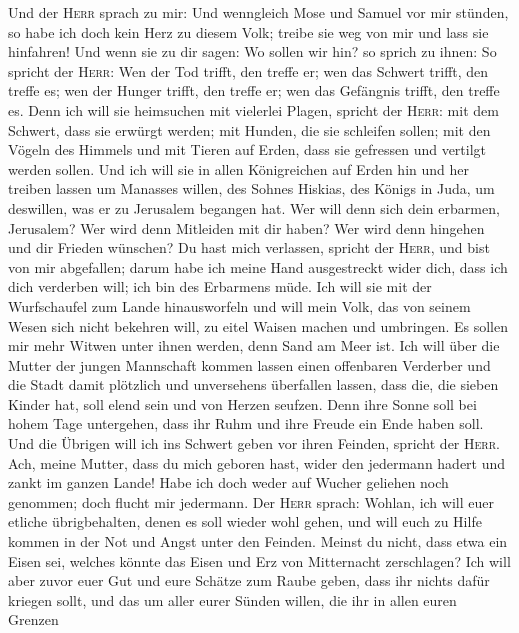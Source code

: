  Und der \textsc{Herr} sprach zu mir: Und wenngleich Mose
und Samuel vor mir stünden, so habe ich doch kein Herz zu diesem Volk;
treibe sie weg von mir und lass sie hinfahren!  Und wenn
sie zu dir sagen: Wo sollen wir hin? so sprich zu ihnen: So spricht der
\textsc{Herr}: Wen der Tod trifft, den treffe er; wen das Schwert
trifft, den treffe es; wen der Hunger trifft, den treffe er; wen das
Gefängnis trifft, den treffe es.  Denn ich will sie
heimsuchen mit vielerlei Plagen, spricht der \textsc{Herr}: mit dem
Schwert, dass sie erwürgt werden; mit Hunden, die sie schleifen sollen;
mit den Vögeln des Himmels und mit Tieren auf Erden, dass sie gefressen
und vertilgt werden sollen.  Und ich will sie in allen
Königreichen auf Erden hin und her treiben lassen um Manasses willen,
des Sohnes Hiskias, des Königs in Juda, um deswillen, was er zu
Jerusalem begangen hat.  Wer will denn sich dein erbarmen,
Jerusalem? Wer wird denn Mitleiden mit dir haben? Wer wird denn hingehen
und dir Frieden wünschen?  Du hast mich verlassen, spricht
der \textsc{Herr}, und bist von mir abgefallen; darum habe ich meine
Hand ausgestreckt wider dich, dass ich dich verderben will; ich bin des
Erbarmens müde.  Ich will sie mit der Wurfschaufel zum
Lande hinausworfeln und will mein Volk, das von seinem Wesen sich nicht
bekehren will, zu eitel Waisen machen und umbringen.  Es
sollen mir mehr Witwen unter ihnen werden, denn Sand am Meer ist. Ich
will über die Mutter der jungen Mannschaft kommen lassen einen
offenbaren Verderber und die Stadt damit plötzlich und unversehens
überfallen lassen,  dass die, die sieben Kinder hat, soll
elend sein und von Herzen seufzen. Denn ihre Sonne soll bei hohem Tage
untergehen, dass ihr Ruhm und ihre Freude ein Ende haben soll. Und die
Übrigen will ich ins Schwert geben vor ihren Feinden, spricht der
\textsc{Herr}.  Ach, meine Mutter, dass du mich geboren
hast, wider den jedermann hadert und zankt im ganzen Lande! Habe ich
doch weder auf Wucher geliehen noch genommen; doch flucht mir jedermann.
 Der \textsc{Herr} sprach: Wohlan, ich will euer etliche
übrigbehalten, denen es soll wieder wohl gehen, und will euch zu Hilfe
kommen in der Not und Angst unter den Feinden.  Meinst du
nicht, dass etwa ein Eisen sei, welches könnte das Eisen und Erz von
Mitternacht zerschlagen?  Ich will aber zuvor euer Gut
und eure Schätze zum Raube geben, dass ihr nichts dafür kriegen sollt,
und das um aller eurer Sünden willen, die ihr in allen euren Grenzen

